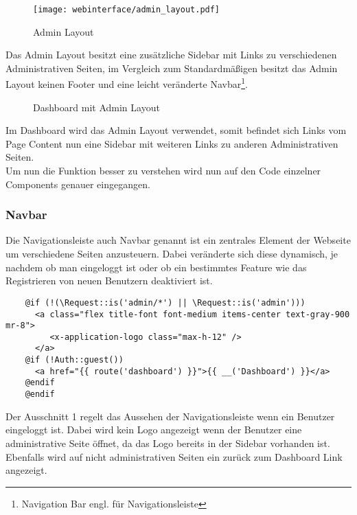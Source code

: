 \begin{figure}[H]
  \centering
  \texttt{[image: webinterface/admin\_layout.pdf]}
  \caption{Admin Layout}
\end{figure}

Das Admin Layout besitzt eine zusätzliche Sidebar mit Links zu verschiedenen
Administrativen Seiten, im Vergleich zum Standardmäßigen besitzt das Admin
Layout keinen Footer und eine leicht veränderte Navbar\footnote{Navigation Bar
engl. für Navigationsleiste}.

\begin{figure}[H]
  \centering
  \caption{Dashboard mit Admin Layout}
\end{figure}

Im Dashboard wird das Admin Layout verwendet, somit befindet sich Links vom Page
Content nun eine Sidebar mit weiteren Links zu anderen Administrativen Seiten.\\

Um nun die Funktion besser zu verstehen wird nun auf den Code einzelner
Components genauer eingegangen.

\subsubsection{Navbar}
Die Navigationsleiste auch Navbar genannt ist ein zentrales Element der Webseite
um verschiedene Seiten anzusteuern. Dabei veränderte sich diese dynamisch, je
nachdem ob man eingeloggt ist oder ob ein bestimmtes Feature wie das
Registrieren von neuen Benutzern deaktiviert ist.

\begin{listing}[H]
  \begin{verbatim}
    @if (!(\Request::is('admin/*') || \Request::is('admin')))
      <a class="flex title-font font-medium items-center text-gray-900 mr-8">
         <x-application-logo class="max-h-12" />
      </a>
    @if (!Auth::guest())
      <a href="{{ route('dashboard') }}">{{ __('Dashboard') }}</a>
    @endif
    @endif
  \end{verbatim}
  \caption{Ausschnitt 1 navigation.blade.php}
\end{listing}

Der Ausschnitt 1 regelt das Aussehen der Navigationsleiste wenn ein Benutzer
eingeloggt ist. Dabei wird kein Logo angezeigt wenn der Benutzer eine
administrative Seite öffnet, da das Logo bereits in der
Sidebar vorhanden ist. Ebenfalls wird auf nicht administrativen Seiten ein
zurück zum Dashboard Link angezeigt.

